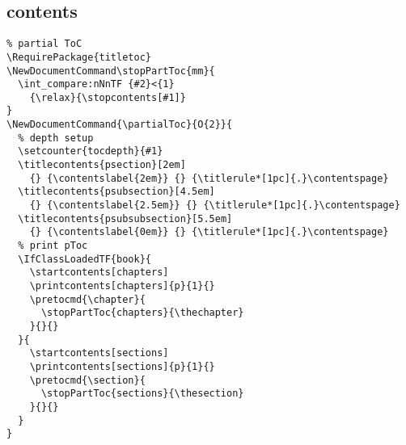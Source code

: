 \subsection{contents}
\begin{verbatim}
% partial ToC
\RequirePackage{titletoc}
\NewDocumentCommand\stopPartToc{mm}{
  \int_compare:nNnTF {#2}<{1}
    {\relax}{\stopcontents[#1]}
}
\NewDocumentCommand{\partialToc}{O{2}}{
  % depth setup
  \setcounter{tocdepth}{#1} 
  \titlecontents{psection}[2em]
    {} {\contentslabel{2em}} {} {\titlerule*[1pc]{.}\contentspage}
  \titlecontents{psubsection}[4.5em]
    {} {\contentslabel{2.5em}} {} {\titlerule*[1pc]{.}\contentspage}
  \titlecontents{psubsubsection}[5.5em]
    {} {\contentslabel{0em}} {} {\titlerule*[1pc]{.}\contentspage}
  % print pToc
  \IfClassLoadedTF{book}{ 
    \startcontents[chapters]
    \printcontents[chapters]{p}{1}{}
    \pretocmd{\chapter}{
      \stopPartToc{chapters}{\thechapter}
    }{}{}
  }{
    \startcontents[sections]
    \printcontents[sections]{p}{1}{}
    \pretocmd{\section}{
      \stopPartToc{sections}{\thesection}
    }{}{}
  }
}
\end{verbatim}

